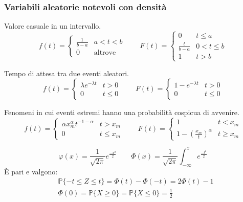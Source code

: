 \subsubsection{Variabili aleatorie notevoli con densità}
\begin{definition}
	Valore casuale in un intervallo.
	\begin{equation}
		f(t)=\begin{cases}
			\frac{1}{b-a} & a<t<b\\
			0 & \text{altrove}
		\end{cases} \quad\quad
		F(t) = \begin{cases}
			0 & t \leq a \\
			\frac{t}{b-a} & 0 < t \leq b \\
			1 & t >b
		\end{cases}
	\end{equation}
\end{definition}
\begin{definition}
	Tempo di attesa tra due eventi aleatori.
	\begin{equation}
		f(t)=\begin{cases}
			\lambda e^{-\lambda t} & t>0\\
			0 & t \leq 0
		\end{cases} \quad\quad
		F(t) = \begin{cases}
			1 - e^{-\lambda t} & t>0\\
			0 & t\leq 0
		\end{cases}
	\end{equation}
\end{definition}
\begin{definition}
	Fenomeni in cui eventi estremi hanno una probabilità cospicua di avvenire.
	\begin{equation}
		f(t)=\begin{cases}
			\alpha x_m^\alpha t^{-1-\alpha} & t>x_m\\
			0 & t \leq x_m
		\end{cases} \quad\quad
		F(t) = \begin{cases}
			1 & t< x_m \\
			1 - (\frac{x_m}{t})^\alpha & t\geq x_m
		\end{cases}
	\end{equation}
\end{definition}
\begin{definition}
	\begin{equation}
		\varphi(x) = \frac{1}{\sqrt{2 \pi}} e^{\frac{-x^2}{2}} \quad\quad
		\Phi(x) = \frac{1}{\sqrt{2\pi}} \int_{-\infty}^{x}e^{\frac{-t^2}{2}}
	\end{equation}
	È pari e valgono:
	\begin{align}
		& \mathbb{P}\{-t \leq Z \leq t\} = \Phi(t) - \Phi(-t) = 2\Phi(t)-1 \\
		& \Phi(0) = \mathbb{P}\{X \geq 0\} = \mathbb{P} \{X \leq 0\} = \frac{1}{2}
	\end{align}
\end{definition}
